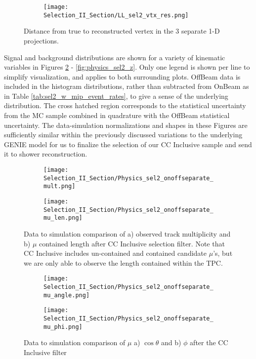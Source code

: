 \begin{figure}[H]
\centering
 \begin{subfigure}[t]{0.8\textwidth}
    \centering
\texttt{[image: Selection\_II\_Section/LL\_sel2\_vtx\_res.png]}
    \caption{ }
  \end{subfigure} 
\caption{Distance from true to reconstructed vertex in the 3 separate 1-D projections. }
\label{fig:physics_sel2_vtxres}
\end{figure}

\par Signal and background distributions are shown for a variety of kinematic variables in Figures \ref{fig:physics_sel2_mulen} - \ref{fig:physics_sel2_z}. Only one legend is shown per line to simplify visualization, and applies to both surrounding plots.  OffBeam data is included in the histogram distributions, rather than subtracted from OnBeam as in Table \ref{tab:sel2_w_mip_event_rates}, to give a sense of the underlying distribution.  The cross hatched region corresponds to the statistical uncertainty from the MC sample combined in quadrature with the OffBeam statistical uncertainty.  The data-simulation normalizations and shapes in these Figures are sufficiently similar within the previously discussed variations to the underlying GENIE model for us to finalize the selection of our CC Inclusive sample and send it to shower reconstruction.

\begin{figure}[h!]
  \begin{subfigure}[t]{0.3\textwidth}
\texttt{[image: Selection\_II\_Section/Physics\_sel2\_onoffseparate\_mult.png]}
    \caption{ }
  \end{subfigure} 
  \hspace{34 mm}
  \begin{subfigure}[t]{0.3\textwidth}
\texttt{[image: Selection\_II\_Section/Physics\_sel2\_onoffseparate\_mu\_len.png]}
    \caption{ }
  \end{subfigure} 
 
\caption{ Data to simulation comparison of a) observed track multiplicity and b) $\mu$ contained length after CC Inclusive selection filter.  Note that CC Inclusive includes un-contained and contained candidate $\mu$'s, but we are only able to observe the length contained within the TPC.  }
\label{fig:physics_sel2_mulen}
\end{figure}

\begin{figure}[h!]
  \begin{subfigure}[t]{0.3\textwidth}
\texttt{[image: Selection\_II\_Section/Physics\_sel2\_onoffseparate\_mu\_angle.png]}
   \caption{ }
  \end{subfigure} 
  \hspace{34 mm}
  \begin{subfigure}[t]{0.3\textwidth}
    \texttt{[image: Selection\_II\_Section/Physics\_sel2\_onoffseparate\_mu\_phi.png]}
  \caption{ }
  \end{subfigure} 
\caption{ Data to simulation comparison of $\mu$ a) $\cos\theta$  and b) $\phi$ after the CC Inclusive filter }
\label{fig:physics_sel2_muphi}
\end{figure}

